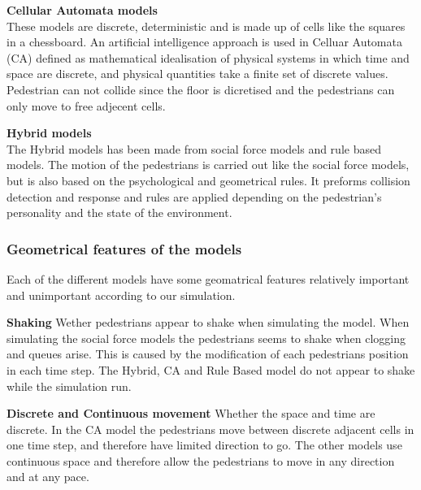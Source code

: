 \textbf{Cellular Automata models}\\
These models are discrete, deterministic and is made up of cells like the squares in a chessboard.
An artificial intelligence approach is used in Celluar Automata (CA) defined as mathematical idealisation 
of physical systems in which time and space are discrete, and physical quantities take a finite set of 
discrete values. Pedestrian can not collide since the floor is dicretised and the pedestrians can
only move to free adjecent cells.\cite{Comparison}

\textbf{Hybrid models}\\
The Hybrid models has been made from social force models and rule based models. 
The motion of the pedestrians is carried out like the social force models, but is also based 
on the psychological and geometrical rules. It preforms collision detection and response and rules 
are applied depending on the pedestrian's personality and the state of the environment. 
\cite{Comparison}

\subsubsection{Geometrical features of the models}
Each of the different models have some geomatrical features relatively important and 
unimportant according to our simulation.

\textbf{Shaking} Wether pedestrians appear to shake when simulating the model. When 
simulating the social force models the pedestrians seems to shake when clogging and 
queues arise. This is caused by the modification of each pedestrians position in each 
time step. The Hybrid, CA and Rule Based model do not appear to shake while the simulation run.

\textbf{Discrete and Continuous movement} Whether the space and time are 
discrete.  In the CA model the pedestrians move between discrete adjacent 
cells in one time step, and therefore have limited direction to go. The other 
models use continuous space and therefore allow the pedestrians to move 
in any direction and at any pace.
 
